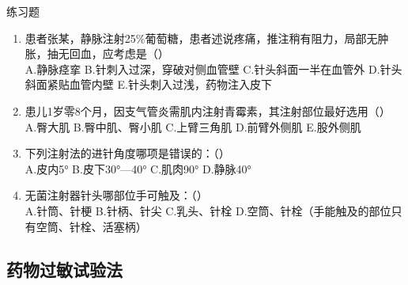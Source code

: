 \documentclass[11pt, a4paper]{ctexart}
\begin{document}
\begin{examplebox}{练习题}
\begin{enumerate}
		      A.减轻胃肠道刺激 \quad B.增强药物疗效 \quad C.维持血液pH \quad D.避免损害造血系统 \quad E.增加药物溶解度，避免结晶析出
		\item 患者张某，静脉注射25\%葡萄糖，患者述说疼痛，推注稍有阻力，局部无肿胀，抽无回血，应考虑是（\qquad）\\
		      A.静脉痉挛 \quad B.针刺入过深，穿破对侧血管壁 \quad C.针头斜面一半在血管外 \quad D.针头斜面紧贴血管内壁 \quad E.针头刺入过浅，药物注入皮下
		\item 患儿1岁零8个月，因支气管炎需肌内注射青霉素，其注射部位最好选用（\qquad）\\
		      A.臀大肌 \quad B.臀中肌、臀小肌 \quad C.上臂三角肌 \quad D.前臂外侧肌 \quad E.股外侧肌
		\item 下列注射法的进针角度哪项是错误的：（\qquad）\\
		      A.皮内5° \quad B.皮下30°—40° \quad C.肌肉90° \quad D.静脉40°
		\item 无菌注射器针头哪部位手可触及：（\qquad）\\
		      A.针筒、针梗 \quad B.针柄、针尖 \quad C.乳头、针栓 \quad D.空筒、针栓（手能触及的部位只有空筒、针栓、活塞柄）
	\end{enumerate}
\end{examplebox}

\subsection{药物过敏试验法}
\end{document}
